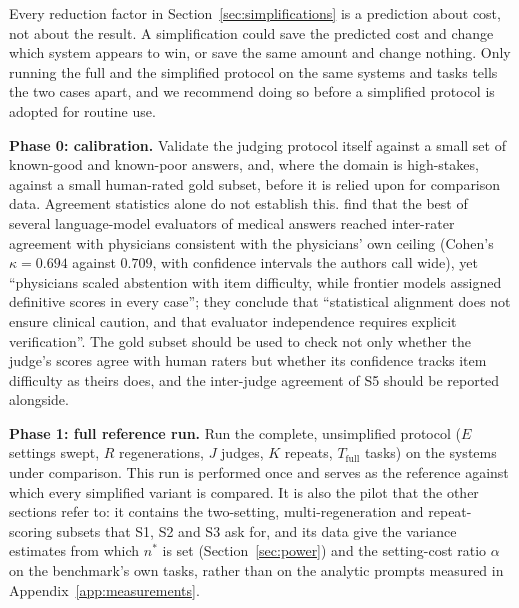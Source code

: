 \documentclass[11pt]{article}
\begin{document}
Every reduction factor in Section~\ref{sec:simplifications} is a prediction about cost, not about the result. A simplification could save the predicted cost and change which system appears to win, or save the same amount and change nothing. Only running the full and the simplified protocol on the same systems and tasks tells the two cases apart, and we recommend doing so before a simplified protocol is adopted for routine use.

\textbf{Phase 0: calibration.} Validate the judging protocol itself against a small
set of known-good and known-poor answers, and, where the domain is high-stakes, against a
small human-rated gold subset, before it is relied upon for comparison data. Agreement statistics alone do not establish this. \citet{philipp2026clinical} find that the best of
several language-model evaluators of medical answers reached inter-rater agreement with
physicians consistent with the physicians' own ceiling (Cohen's $\kappa = 0.694$ against $0.709$, with confidence intervals the authors call wide), yet
``physicians scaled abstention with item difficulty, while frontier models assigned
definitive scores in every case''; they conclude that ``statistical alignment does not
ensure clinical caution, and that evaluator independence requires explicit
verification''. The gold subset should be used to check not only whether the
judge's scores agree with human raters but whether its confidence tracks item difficulty
as theirs does, and the inter-judge agreement of S5 should be reported alongside.

\textbf{Phase 1: full reference run.} Run the complete, unsimplified protocol
($E$ settings swept, $R$ regenerations, $J$ judges, $K$ repeats, $T_{\text{full}}$ tasks)
on the systems under comparison. This run is performed once and serves as the reference against which every simplified variant is compared. It is also the pilot that the other sections refer to: it contains the two-setting, multi-regeneration and repeat-scoring subsets that S1, S2 and S3 ask for, and its data give the variance estimates from which $n^*$ is set (Section~\ref{sec:power}) and the setting-cost ratio $\alpha$ on the benchmark's own tasks, rather than on the analytic prompts measured in Appendix~\ref{app:measurements}.
\end{document}
